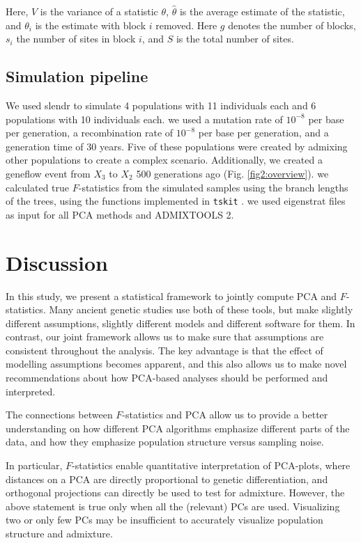 \documentclass[12pt]{article}
\begin{document}
Here, $V$ is the variance of a statistic $\theta$, $\hat{\theta}$ is the average estimate of the statistic, and $\theta_i$ is the estimate with block $i$ removed. Here $g$ denotes the number of blocks, $s_i$ the number of sites in block $i$, and $S$ is the total number of sites.

\subsection{Simulation pipeline}

We used slendr \citep{petr_slendr_2022} to simulate 4 populations with 11 individuals each and 6 populations with 10 individuals each. we used a mutation rate of $10^{-8}$ per base per generation, a recombination rate of $10^{-8}$ per base per generation, and a generation time of 30 years. Five of these populations were created by admixing other populations to create a complex scenario. Additionally, we created a geneflow event from $X_3$ to $X_2$ 500 generations ago (Fig. \ref{fig2:overview}). we calculated true $F$-statistics from the simulated samples using the branch lengths of the trees, using the functions implemented in \texttt{tskit} \citep{baumdicker_efficient_2022}. we used eigenstrat files as input for all PCA methods and ADMIXTOOLS 2. 

\section{Discussion}
In this study, we present a statistical framework to jointly compute PCA and $F$-statistics. Many ancient genetic studies use both of these tools, but make slightly different assumptions, slightly different models and different software for them. In contrast, our joint framework allows us to make sure that assumptions are consistent throughout the analysis. The key advantage is that the effect of modelling assumptions becomes apparent, and this also allows us to make novel recommendations about how PCA-based analyses should be performed and interpreted.

The connections between $F$-statistics and PCA allow us to provide a better understanding on how different PCA algorithms emphasize different parts of the data, and how they emphasize population structure versus sampling noise.

In particular, $F$-statistics enable quantitative interpretation of PCA-plots, where distances on a PCA are directly proportional to genetic differentiation, and orthogonal projections can directly be used to test for admixture.
However, the above statement is true only when all the (relevant) PCs are used. Visualizing two or only few PCs may be insufficient to accurately visualize population structure and admixture. 
\end{document}
